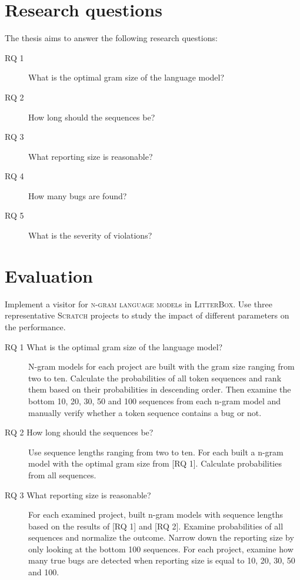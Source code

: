 \documentclass[
    numbers=noenddot,
    parskip=half-,
    fontsize=12pt,
    paper=a4,
    oneside,
    titlepage,
    bibliography=totoc,
    chapterprefix=false,
]{scrbook}
\newcommand{\ngram}{\textsc{n-gram language model}}
\newcommand{\litterbox}{\textsc{LitterBox}}
\newcommand{\scratch}{\textsc{Scratch}}
\begin{document}
    \chapter{Research questions}\label{ch:research-questions}
    The thesis aims to answer the following research questions:

    \begin{description}
        \item[RQ 1] What is the optimal gram size of the language model?
        \item[RQ 2] How long should the sequences be?
        \item[RQ 3] What reporting size is reasonable?
        \item[RQ 4] How many bugs are found?
        \item[RQ 5] What is the severity of violations?
    \end{description}


    \chapter{Evaluation}\label{ch:evaluation}
    
    Implement a visitor for \ngram{s} in \litterbox{}. Use three representative \scratch{} projects to study the impact of different parameters on the performance.  
    
    \begin{description}
        \item[RQ 1 What is the optimal gram size of the language model?] N-gram models for each project are built with the gram size ranging from two to ten. Calculate the probabilities of all token sequences and rank them based on their probabilities in descending order. Then examine the bottom 10, 20, 30, 50 and 100 sequences from each n-gram model and manually verify whether a token sequence contains a bug or not.
        \item[RQ 2 How long should the sequences be?]
        Use sequence lengths ranging from two to ten. For each built a n-gram model with the optimal gram size from [RQ 1]. Calculate probabilities from all sequences.
        \item[RQ 3 What reporting size is reasonable?]
        For each examined project, built n-gram models with sequence lengths based on the results of [RQ 1] and [RQ 2]. Examine probabilities of all sequences and normalize the outcome. Narrow down the reporting size by only looking at the bottom 100 sequences. For each project, examine how many true bugs are detected when reporting size is equal to 10, 20, 30, 50 and 100.
    \end{description}
\end{document}

